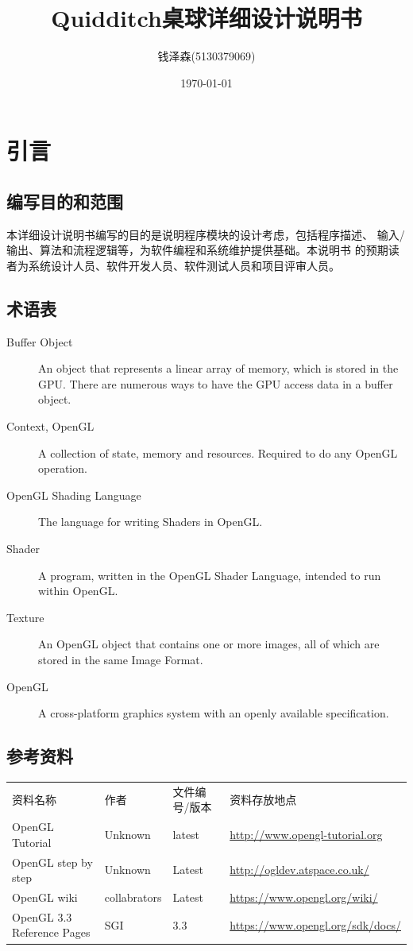 \documentclass[11pt]{article}
\author{钱泽森(5130379069)}
\date{\today}
\title{Quidditch桌球详细设计说明书}
\begin{document}
\maketitle
\tableofcontents


\section{引言}
\label{sec-1}
\subsection{编写目的和范围}
\label{sec-1-1}
本详细设计说明书编写的目的是说明程序模块的设计考虑，包括程序描述、
输入/输出、算法和流程逻辑等，为软件编程和系统维护提供基础。本说明书
的预期读者为系统设计人员、软件开发人员、软件测试人员和项目评审人员。
\subsection{术语表}
\label{sec-1-2}
\begin{description}
\item[{Buffer Object}] An object that represents a linear array of
memory, which is stored in the GPU. There are
numerous ways to have the GPU access data in a
buffer object.
\item[{Context, OpenGL}] A collection of state, memory and resources.
Required to do any OpenGL operation.
\item[{OpenGL Shading Language}] The language for writing Shaders in
OpenGL.
\item[{Shader}] A program, written in the OpenGL Shader Language,
intended to run within OpenGL.
\item[{Texture}] An OpenGL object that contains one or more images, all
of which are stored in the same Image Format.
\item[{OpenGL}] A cross-platform graphics system with an openly
available specification.
\end{description}
\subsection{参考资料}
\label{sec-1-3}
\begin{center}
\begin{tabular}{llll}
资料名称 & 作者 & 文件编号/版本 & 资料存放地点\\
OpenGL Tutorial & Unknown & latest & \url{http://www.opengl-tutorial.org}\\
OpenGL step by step & Unknown & Latest & \url{http://ogldev.atspace.co.uk/}\\
OpenGL wiki & collabrators & Latest & \url{https://www.opengl.org/wiki/}\\
OpenGL 3.3 Reference Pages & SGI & 3.3 & \url{https://www.opengl.org/sdk/docs/}\\
\end{tabular}
\end{center}
\end{document}
